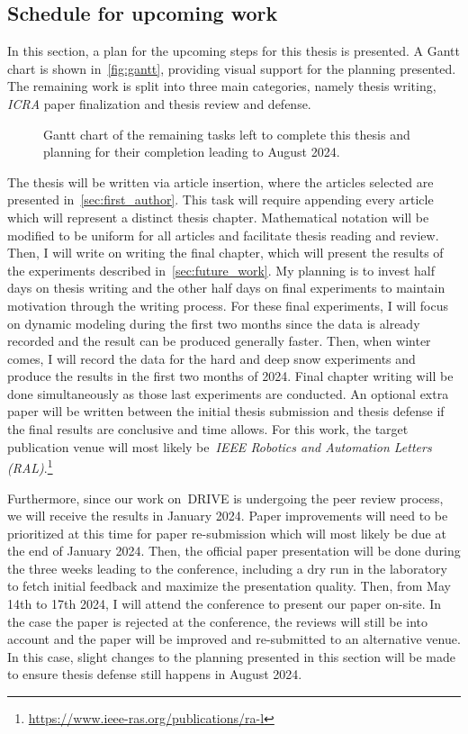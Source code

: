 \documentclass[12pt,letterpaper,oneside]{article}
\begin{document}
\subsection{Schedule for upcoming work}
\label{sec:schedule}

In this section, a plan for the upcoming steps for this thesis is presented. 
A Gantt chart is shown in~\autoref{fig:gantt}, providing visual support for the planning presented.
The remaining work is split into three main categories, namely thesis writing, \emph{ICRA} paper finalization and thesis review and defense.
\setlength{\fboxsep}{9pt}
\begin{figure}[h!]
	\centering
	
	\caption{Gantt chart of the remaining tasks left to complete this thesis and planning for their completion leading to August 2024.}
	\label{fig:gantt}
\end{figure}
\setlength{\fboxsep}{12pt}

The thesis will be written via article insertion, where the articles selected are presented in~\autoref{sec:first_author}.
This task will require appending every article which will represent a distinct thesis chapter.
Mathematical notation will be modified to be uniform for all articles and facilitate thesis reading and review.
Then, I will write on writing the final chapter, which will present the results of the experiments described in~\autoref{sec:future_work}.
My planning is to invest half days on thesis writing and the other half days on final experiments to maintain motivation through the writing process.
For these final experiments, I will focus on dynamic modeling during the first two months since the data is already recorded and the result can be produced generally faster.
Then, when winter comes, I will record the data for the hard and deep snow experiments and produce the results in the first two months of 2024.
Final chapter writing will be done simultaneously as those last experiments are conducted.
An optional extra paper will be written between the initial thesis submission and thesis defense if the final results are conclusive and time allows.
For this work, the target publication venue will most likely be~\emph{IEEE Robotics and Automation Letters (RAL)}.\footnote{\url{https://www.ieee-ras.org/publications/ra-l}}

Furthermore, since our work on~\ac{DRIVE} is undergoing the peer review process, we will receive the results in January 2024.
Paper improvements will need to be prioritized at this time for paper re-submission which will most likely be due at the end of January 2024.
Then, the official paper presentation will be done during the three weeks leading to the conference, including a dry run in the laboratory to fetch initial feedback and maximize the presentation quality.
Then, from May 14th to 17th 2024, I will attend the conference to present our paper on-site.
In the case the paper is rejected at the conference, the reviews will still be into account and the paper will be improved and re-submitted to an alternative venue.
In this case, slight changes to the planning presented in this section will be made to ensure thesis defense still happens in August 2024.
\end{document}
